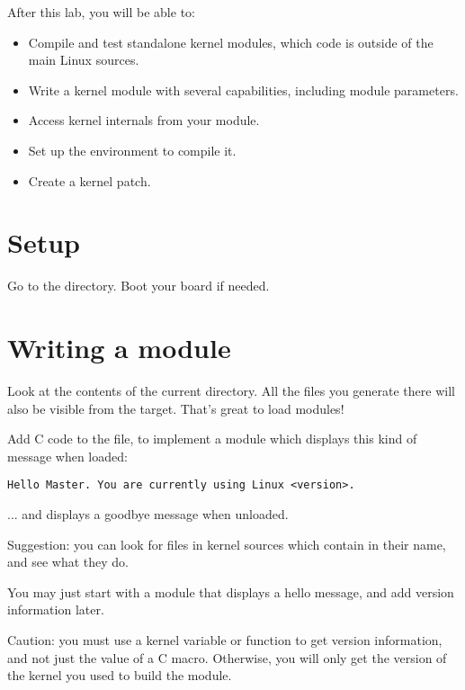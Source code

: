 
After this lab, you will be able to:

\begin{itemize}
\item Compile and test standalone kernel modules, which code is outside of the main Linux sources.
\item Write a kernel module with several capabilities, including module parameters.
\item Access kernel internals from your module.
\item Set up the environment to compile it.
\item Create a kernel patch.
\end{itemize}

\section{Setup}

Go to the  directory.
Boot your board if needed.

\section{Writing a module}

Look at the contents of the current directory. All the files you generate
there will also be visible from the target. That's great to load
modules!

Add C code to the  file, to implement a module which
displays this kind of message when loaded:

\begin{verbatim}
Hello Master. You are currently using Linux <version>.
\end{verbatim}

... and displays a goodbye message when unloaded.

Suggestion: you can look for files in kernel sources which
contain  in their name, and see what they do.

You may just start with a module that displays a hello message, and
add version information later.

Caution: you must use a kernel variable or function to get version
information, and not just the value of a C macro. Otherwise, you will
only get the version of the kernel you used to build the
module.

